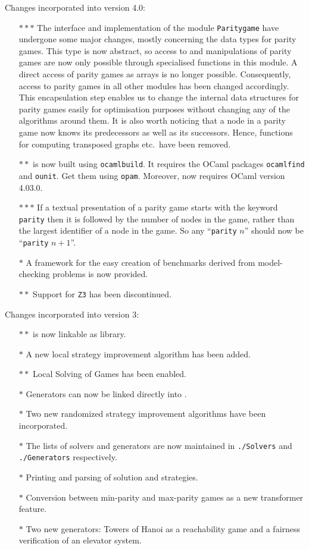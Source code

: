 Changes incorporated into version 4.0:
\begin{itemize}
\item[$\ast\ast\ast$] The interface and implementation of the module \texttt{Paritygame} have undergone some major changes,
     mostly concerning the data types for parity games. This type is now abstract, so access to and manipulations of parity games
     are now only possible through specialised functions in this module. A direct access of parity games as arrays is no longer
     possible. Consequently, access to parity games in all other modules has been changed accordingly. This encapsulation step 
     enables us to change the internal data structures for parity games easily for optimisation purposes without changing any of 
     the algorithms around them. It is also worth noticing that a node in a parity game now knows its predecessors as well as its
     successors. Hence, functions for computing transposed graphs etc.\ have been removed.
\item[$\ast\ast$] \pgsolver is now built using \texttt{ocamlbuild}. It requires the OCaml packages \texttt{ocamlfind} and \texttt{ounit}.
     Get them using \texttt{opam}. Moreover, \pgsolver now requires OCaml version 4.03.0.
\item[$\ast\ast\ast$] If a textual presentation of a parity game starts with the keyword \texttt{parity} then it is followed by the number of
     nodes in the game, rather than the largest identifier of a node in the game. So any ``\texttt{parity} $n$'' should now be 
     ``\texttt{parity} $n+1$''.
\item[$\ast$] A framework for the easy creation of benchmarks derived from model-checking problems is now provided. 
\item[$\ast\ast$] Support for \texttt{Z3} has been discontinued.  
\end{itemize}

Changes incorporated into version 3:
\begin{itemize}
\item[$\ast\ast$] \pgsolver is now linkable as library.
\item[$\ast$] A new local strategy improvement algorithm has been added.
\item[$\ast\ast$] Local Solving of Games has been enabled.
\item[$\ast$] Generators can now be linked directly into \pgsolver.
\item[$\ast$] Two new randomized strategy improvement algorithms have been incorporated.
\item[$\ast$] The lists of solvers and generators are now maintained in \texttt{./Solvers} and \texttt{./Generators} respectively.
\item[$\ast$] Printing and parsing of solution and strategies.
\item[$\ast$] Conversion between min-parity and max-parity games as a new transformer feature.
\item[$\ast$] Two new generators: Towers of Hanoi as a reachability game and a fairness verification of an elevator system.
\end{itemize} 



